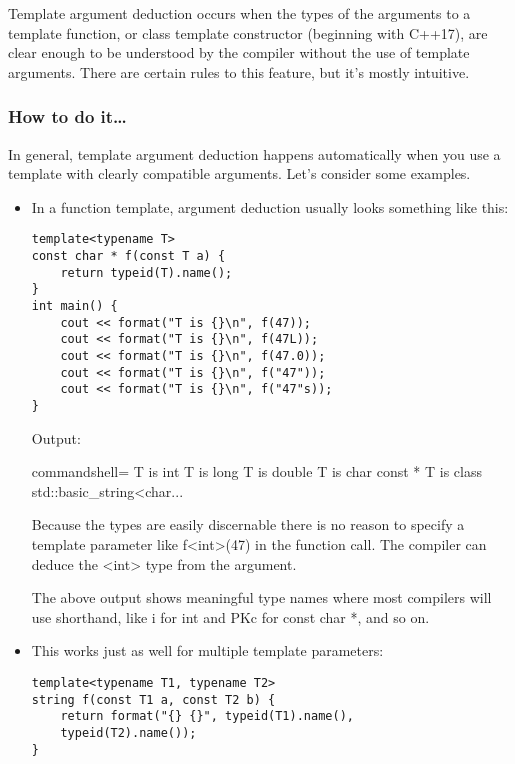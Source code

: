 
Template argument deduction occurs when the types of the arguments to a template function, or class template constructor (beginning with C++17), are clear enough to be understood by the compiler without the use of template arguments. There are certain rules to this feature, but it's mostly intuitive.

\subsubsection{How to do it…}

In general, template argument deduction happens automatically when you use a template with clearly compatible arguments. Let's consider some examples.

\begin{itemize}
\item 
In a function template, argument deduction usually looks something like this:

\begin{lstlisting}[style=styleCXX]
template<typename T>
const char * f(const T a) {
	return typeid(T).name();
}
int main() {
	cout << format("T is {}\n", f(47));
	cout << format("T is {}\n", f(47L));
	cout << format("T is {}\n", f(47.0));
	cout << format("T is {}\n", f("47"));
	cout << format("T is {}\n", f("47"s));
}
\end{lstlisting}

Output:

\begin{tcblisting}{commandshell={}}
T is int
T is long
T is double
T is char const *
T is class std::basic_string<char...
\end{tcblisting}

Because the types are easily discernable there is no reason to specify a template parameter like f<int>(47) in the function call. The compiler can deduce the <int> type from the argument.

\begin{tcolorbox}[colback=webgreen!5!white,colframe=webgreen!75!black,title=Note]
The above output shows meaningful type names where most compilers will use shorthand, like i for int and PKc for const char *, and so on.
\end{tcolorbox}

\item 
This works just as well for multiple template parameters:

\begin{lstlisting}[style=styleCXX]
template<typename T1, typename T2>
string f(const T1 a, const T2 b) {
	return format("{} {}", typeid(T1).name(),
	typeid(T2).name());
}


\end{lstlisting}
\end{itemize}
